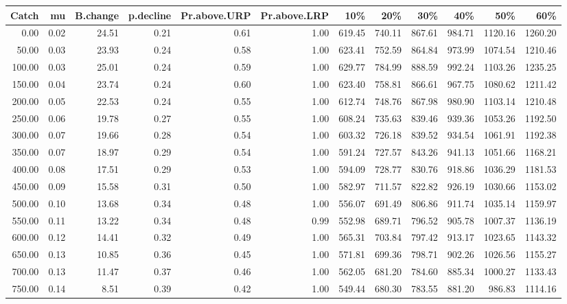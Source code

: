 \begin{table}[ht]
\centering
\begin{tabular}{rrrrrrrrrrrr}
  \hline
Catch & mu & B.change & p.decline & Pr.above.URP & Pr.above.LRP & 10\% & 20\% & 30\% & 40\% & 50\% & 60\% \\ 
  \hline
0.00 & 0.02 & 24.51 & 0.21 & 0.61 & 1.00 & 619.45 & 740.11 & 867.61 & 984.71 & 1120.16 & 1260.20 \\ 
  50.00 & 0.03 & 23.93 & 0.24 & 0.58 & 1.00 & 623.41 & 752.59 & 864.84 & 973.99 & 1074.54 & 1210.46 \\ 
  100.00 & 0.03 & 25.01 & 0.24 & 0.59 & 1.00 & 629.77 & 784.99 & 888.59 & 992.24 & 1103.26 & 1235.25 \\ 
  150.00 & 0.04 & 23.74 & 0.24 & 0.60 & 1.00 & 623.40 & 758.81 & 866.61 & 967.75 & 1080.62 & 1211.42 \\ 
  200.00 & 0.05 & 22.53 & 0.24 & 0.55 & 1.00 & 612.74 & 748.76 & 867.98 & 980.90 & 1103.14 & 1210.48 \\ 
  250.00 & 0.06 & 19.78 & 0.27 & 0.55 & 1.00 & 608.24 & 735.63 & 839.46 & 939.36 & 1053.26 & 1192.50 \\ 
  300.00 & 0.07 & 19.66 & 0.28 & 0.54 & 1.00 & 603.32 & 726.18 & 839.52 & 934.54 & 1061.91 & 1192.38 \\ 
  350.00 & 0.07 & 18.97 & 0.29 & 0.54 & 1.00 & 591.24 & 727.57 & 843.26 & 941.13 & 1051.66 & 1168.21 \\ 
  400.00 & 0.08 & 17.51 & 0.29 & 0.53 & 1.00 & 594.09 & 728.77 & 830.76 & 918.86 & 1036.29 & 1181.53 \\ 
  450.00 & 0.09 & 15.58 & 0.31 & 0.50 & 1.00 & 582.97 & 711.57 & 822.82 & 926.19 & 1030.66 & 1153.02 \\ 
  500.00 & 0.10 & 13.68 & 0.34 & 0.48 & 1.00 & 556.07 & 691.49 & 806.86 & 911.74 & 1035.14 & 1159.97 \\ 
  550.00 & 0.11 & 13.22 & 0.34 & 0.48 & 0.99 & 552.98 & 689.71 & 796.52 & 905.78 & 1007.37 & 1136.19 \\ 
  600.00 & 0.12 & 14.41 & 0.32 & 0.49 & 1.00 & 565.31 & 703.84 & 797.42 & 913.17 & 1023.65 & 1143.32 \\ 
  650.00 & 0.13 & 10.85 & 0.36 & 0.45 & 1.00 & 571.81 & 699.36 & 798.71 & 902.26 & 1026.56 & 1155.27 \\ 
  700.00 & 0.13 & 11.47 & 0.37 & 0.46 & 1.00 & 562.05 & 681.20 & 784.60 & 885.34 & 1000.27 & 1133.43 \\ 
  750.00 & 0.14 & 8.51 & 0.39 & 0.42 & 1.00 & 549.44 & 680.30 & 783.55 & 881.20 & 986.83 & 1114.16 \\ 

\end{tabular}
\end{table}
